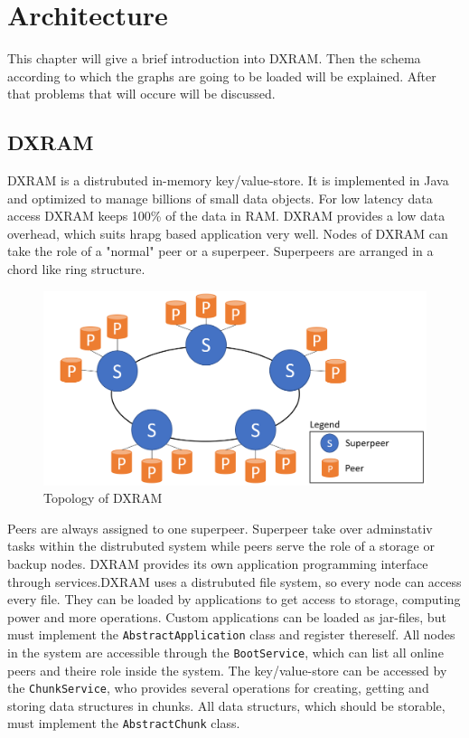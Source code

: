 \chapter{Architecture}
\label{Architecture}
This chapter will give a brief introduction into DXRAM. Then the schema according to which the graphs are going to be loaded will be explained. After that problems that will occure will be discussed. 
\section{DXRAM}
DXRAM is a distrubuted in-memory key/value-store. 
It is implemented in Java and optimized to manage billions of small data objects. 
For low latency data access DXRAM keeps 100\% of the data in RAM.
DXRAM provides a low data overhead, which suits hrapg based application very well.
Nodes of DXRAM can take the role of a "normal" peer or a superpeer. Superpeers are arranged in a chord like ring structure. \begin{figure}[H]
	\centering
	\includegraphics[width=1.0\linewidth]{img/topology.png}
	\caption{Topology of DXRAM}
	\label{topology}
\end{figure}
Peers are always assigned to one superpeer. Superpeer take over adminstativ tasks within the distrubuted system while peers serve the role of a storage or backup nodes.
DXRAM provides its own application programming interface through services.DXRAM uses a distrubuted file system, so every node can access every file. They can be loaded by applications to get access to storage, computing power and more operations. Custom applications can be loaded as jar-files, but must implement the \texttt{AbstractApplication} class and register thereself. All nodes in the system are accessible through the \texttt{BootService}, which can list all online peers and theire role inside the system.
The key/value-store can be accessed by the \texttt{ChunkService}, who provides several operations for creating, getting and storing data structures in chunks. All data structurs, which should be storable, must implement the \texttt{AbstractChunk} class.\\

